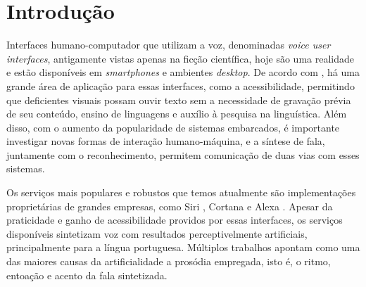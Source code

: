 


\chapter{Introdução}

Interfaces humano-computador que utilizam a voz, denominadas \emph{voice user
  interfaces}, antigamente vistas apenas na ficção científica, hoje são uma
realidade e estão disponíveis em \emph{smartphones} e ambientes \emph{desktop}.
De acordo com \cite{tts-book, martinjurafsky}, há uma grande área de aplicação
para essas interfaces, como a acessibilidade, permitindo que
deficientes visuais possam ouvir texto sem a necessidade de gravação prévia de
seu conteúdo, ensino de linguagens e auxílio à pesquisa na linguística. Além
disso, com o aumento da popularidade de sistemas embarcados, é importante
investigar novas formas de interação humano-máquina, e a síntese de fala,
juntamente com o reconhecimento, permitem comunicação de duas vias com esses
sistemas.


Os serviços mais populares e robustos que temos atualmente são implementações
proprietárias de grandes empresas, como Siri \cite{siri}, Cortana \cite{cortana}
e Alexa \cite{alexa}. Apesar da praticidade e ganho de acessibilidade providos
por essas interfaces, os serviços disponíveis sintetizam voz com resultados
perceptivelmente artificiais, principalmente para a língua portuguesa. Múltiplos
trabalhos \cite{hirschberg,prosodysurvey,taylor2009} apontam como uma das
maiores causas da artificialidade a prosódia empregada, isto é, o ritmo,
entoação e acento da fala sintetizada.

